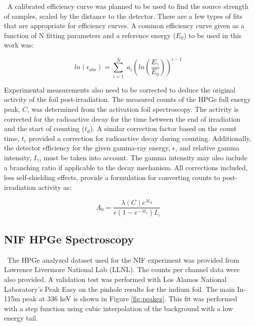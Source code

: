 \documentclass[journal]{IEEEtran}
\begin{document}
\ A calibrated efficiency curve was planned to be used to find the source strength of samples, scaled by the distance to the detector. There are a few types of fits that are appropriate for efficiency curves. A common efficiency curve given as a function of N fitting parameters and a reference energy ($E_{0}$) to be used in this work was:

\begin{equation} \label{eq:effa1}
	ln(\epsilon_{abs}) =   \sum_{i=1}^{N} \; a_{i} (ln(\dfrac{E_{\gamma}}{E_{0}}))^{i-1}
\end{equation}

Experimental measurements also need to be corrected to deduce the original activity of the foil post-irradiation. The measured counts of the HPGe full energy peak, $C$, was determined from the activation foil spectroscopy. The activity is corrected for the radioactive decay for the time between the end of irradiation and the start of counting ($t_{d}$). A similar correction factor based on the count time, $t_{c}$ provided a correction for radioactive decay during counting. Additionally, the detector efficiency for the given gamma-ray energy, $\epsilon$, and relative gamma intensity, $I_{\gamma}$, must be taken into account. The gamma intensity may also include a branching ratio if applicable to the decay mechanism. All corrections included, less self-shielding effects, provide a formulation for converting counts to post-irradiation activity as: 

\begin{equation} \label{eq:MeasActivity}
A_{0} = \frac{\lambda (C) e^{\lambda t_{d}}}{\epsilon (1-e^{-\lambda t_{c}})I_{\gamma}}
\end{equation}

\subsection{NIF HPGe Spectroscopy}

\ The HPGe analyzed dataset used for the NIF experiment was provided from Lawrence Livermore National Lab (LLNL). The counts per channel data were also provided. A validation test was performed with Los Alamos National Laboratory's Peak Easy on the pinhole results for the indium foil\cite{PeakEZ}. The main In-115m peak at 336 keV is shown in Figure \ref{fig:peakez}. This fit was performed with a step function using cubic interpolation of the background with a low energy tail. 
\end{document}
